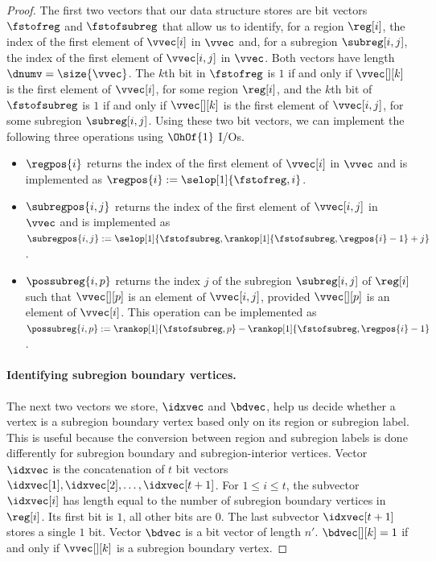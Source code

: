 \begin{proof}
  The first two vectors that our data structure stores are bit vectors
  $\fstofreg$ and $\fstofsubreg$ that
  allow us to identify, for a region $\reg[i]$, the index of the first
  element of $\vvec[i]$ in $\vvec$ and, for a subregion $\subreg[i,j]$,
  the index of the first element of $\vvec[i,j]$ in $\vvec$.
  Both vectors have length $\dnumv = \size{\vvec}$.
  The $k$th bit in $\fstofreg$ is $1$ if and only if $\vvec[][k]$ is the
  first element of $\vvec[i]$, for some region $\reg[i]$,
  and the $k$th bit of $\fstofsubreg$ is $1$
  if and only if $\vvec[][k]$ is the first element of $\vvec[i,j]$, for some
  subregion $\subreg[i,j]$.
  Using these two bit vectors, we can implement the following three operations
  using $\OhOf{1}$ I/Os.
  \begin{itemize}
  \item $\regpos{i}$ returns the index of the first element of $\vvec[i]$
    in $\vvec$ and is implemented as $\regpos{i} := \selop[1]{\fstofreg,i}$.
  \item $\subregpos{i,j}$ returns the index of the first element of $\vvec[i,j]$
    in $\vvec$ and is implemented as\\
    $\subregpos{i,j} := \selop[1]{\fstofsubreg,\rankop[1]{\fstofsubreg,\regpos{i}-1}+j}$.
  \item $\possubreg{i,p}$ returns the index $j$ of the subregion $\subreg[i,j]$
    of $\reg[i]$ such that $\vvec[][p]$ is an element of  $\vvec[i,j]$,
    provided $\vvec[][p]$ is an element of $\vvec[i]$.
    This operation can be implemented as
    $\possubreg{i,p} := \rankop[1]{\fstofsubreg,p} - \rankop[1]{\fstofsubreg,
      \regpos{i} - 1}$.
  \end{itemize}

  \paragraph{Identifying subregion boundary vertices.}

  The next two vectors we store, $\idxvec$ and $\bdvec$, help us decide whether
  a vertex is a subregion boundary vertex based only on its region or subregion
  label.
  This is useful because the conversion between region and subregion
  labels is done differently for subregion boundary and subregion-interior
  vertices.
  Vector $\idxvec$ is the concatenation of $t$ bit vectors
  $\idxvec[1], \idxvec[2], \dots, \idxvec[t+1]$.
  For $1 \le i \le t$, the subvector $\idxvec[i]$ has length equal to the
  number of subregion boundary vertices in $\reg[i]$.
  Its first bit is $1$, all other bits are $0$.
  The last subvector $\idxvec[t+1]$ stores a single $1$ bit.
  Vector $\bdvec$ is a bit vector of length $n'$.
  $\bdvec[][k] = 1$ if and only if $\vvec[][k]$ is a subregion boundary
  vertex.


\end{proof}
